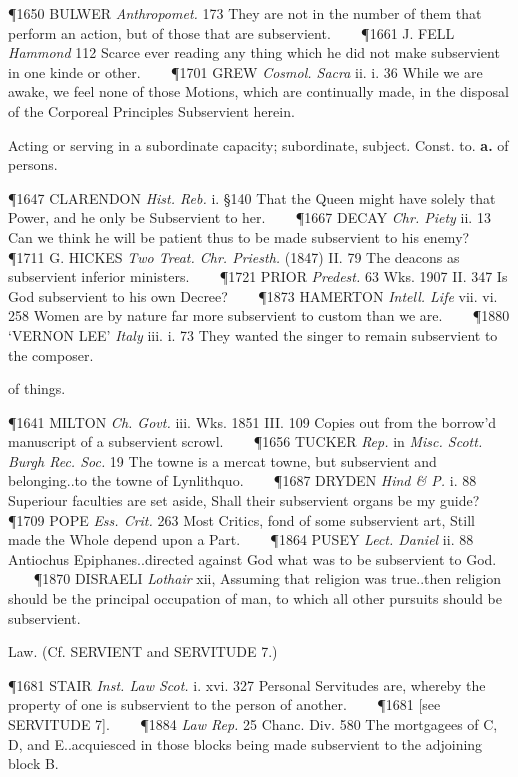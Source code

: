 \begin{description}[wide, labelwidth=!, labelindent=0pt]
\begin{myenumerate}
\P 1650 BULWER  \textit{Anthropomet.} 173 They are not in the number of them that perform an action, but of those that are subservient.    
\P 1661 J. FELL  \textit{Hammond} 112 Scarce ever reading any thing which he did not make subservient in one kinde or other.    
\P 1701 GREW  \textit{Cosmol. Sacra} ii. i. 36 While we are awake, we feel none of those Motions, which are continually made, in the disposal of the Corporeal Principles Subservient herein.

 Acting or serving in a subordinate capacity; subordinate, subject. Const. to. 
\textbf{a.} of persons.

\P 1647 CLARENDON  \textit{Hist. Reb.} i. §140 That the Queen might have solely that Power, and he only be Subservient to her.    
\P 1667 DECAY  \textit{Chr. Piety} ii. 13 Can we think he will be patient thus to be made subservient to his enemy?    
\P 1711 G. HICKES  \textit{Two Treat. Chr. Priesth.} (1847) II. 79 The deacons as subservient inferior ministers.    
\P 1721 PRIOR  \textit{Predest.} 63 Wks. 1907 II. 347  Is God subservient to his own Decree?    
\P 1873 HAMERTON  \textit{Intell. Life} vii. vi. 258 Women are by nature far more subservient to custom than we are.    
\P 1880 ‘VERNON  LEE’ \textit{Italy} iii. i. 73 They wanted the singer to remain subservient to the composer.

 of things.

\P 1641 MILTON  \textit{Ch. Govt.} iii. Wks. 1851 III.  109 Copies out from the borrow'd manuscript of a subservient scrowl.    
\P 1656 TUCKER \textit{Rep.} in  \textit{Misc. Scott. Burgh Rec. Soc.} 19 The towne is a mercat towne, but subservient and belonging..to the towne of Lynlithquo.    
\P 1687 DRYDEN  \textit{Hind \& P.} i. 88 Superiour faculties are set aside, Shall their subservient organs be my guide?    
\P 1709 POPE  \textit{Ess. Crit.} 263 Most Critics, fond of some subservient art, Still made the Whole depend upon a Part.    
\P 1864 PUSEY  \textit{Lect. Daniel} ii. 88 Antiochus Epiphanes..directed against God what was to be subservient to God.    
\P 1870 DISRAELI  \textit{Lothair} xii, Assuming that religion was true..then religion should be the principal occupation of man, to which all other pursuits should be subservient.

 Law. (Cf. SERVIENT and SERVITUDE 7.)

\P 1681 STAIR  \textit{Inst. Law Scot.} i. xvi. 327 Personal Servitudes are, whereby the property of one is subservient to the person of another.    
\P 1681 [see SERVITUDE 7].    
\P 1884  \textit{Law Rep.} 25 Chanc. Div. 580 The mortgagees of C, D, and E..acquiesced in those blocks being made subservient to the adjoining block B.


\end{myenumerate}
\end{description}
